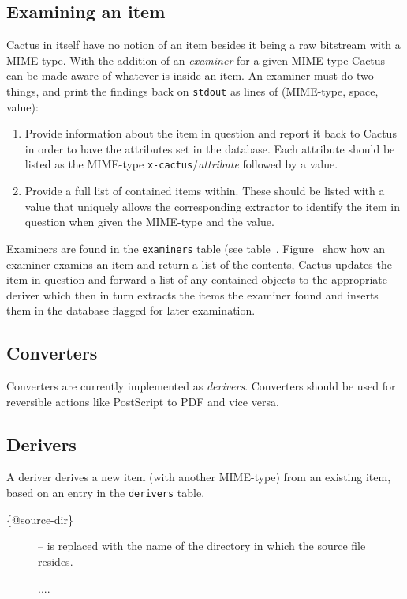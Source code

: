 \subsection{Examining an item}

Cactus in itself have no notion of an item besides it being
a raw bitstream with a MIME-type.  With the addition of an \textit{examiner} for a given MIME-type
Cactus can be made aware of whatever is inside an
item.  An examiner must do two things, and print the
findings back on \texttt{stdout} as lines of 
(MIME-type, space, value):

\begin{enumerate}
\item Provide information about the item in question and report it
  back to Cactus in order to have the attributes set in the database.
  Each attribute should be listed as the MIME-type
  \texttt{x-cactus}/\textit{attribute} followed by a value.
  
\item Provide a full list of contained items within.  These should be
  listed with a value that uniquely allows the corresponding extractor
  to identify the item in question when given the MIME-type and the
  value.
\end{enumerate}

Examiners are found in the \texttt{examiners} table (see
table~.  Figure~
show how an examiner examins an item and return a list of
the contents, Cactus updates the item in question and
forward a list of any contained objects to the appropriate
deriver which then in turn extracts the items the examiner
found and inserts them in the database flagged for later
examination.



\subsection{Converters}

Converters are currently implemented as \textit{derivers}.
Converters should be used for reversible actions like
PostScript to PDF and vice versa.

\subsection{Derivers}

A deriver derives a new item (with another MIME-type) from
an existing item, based on an entry in the \texttt{derivers}
table.
\begin{description}
\item[\{@source-dir\}]  -- is replaced with the name of the directory in which the source file resides.  

\textsf{....}


\end{description}

